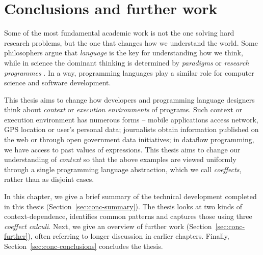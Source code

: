 \chapter{Conclusions and further work}
\label{ch:conclusions}

Some of the most fundamental academic work is not the one solving hard research problems, but the
one that changes how we understand the world. Some philosophers argue that \emph{language} is the
key for understanding how we think, while in science the dominant thinking is determined by
\emph{paradigms} \cite{philosophy-kuhn} or \emph{research programmes} \cite{philosophy-lakatos}.
In a way, programming languages play a similar role for computer science and software development.

This thesis aims to change how developers and programming language designers think about
\emph{context} or \emph{execution environments} of programs. Such context or execution environment
has numerous forms -- mobile applications access network, GPS location or user's personal data;
journalists obtain information published on the web or through open government data initiatives;
in dataflow programming, we have access to past values of expressions.
This thesis aims to change our understanding of \emph{context} so that the above examples are
viewed uniformly through a single programming language abstraction, which we call \emph{coeffects},
rather than as disjoint cases.

In this chapter, we give a brief summary of the technical development completed in this thesis
(Section~\ref{sec:conc-summary}). The thesis looks at two kinds of context-dependence, identifies
common patterns and captures those using three \emph{coeffect calculi}. Next, we give an overview
of further work (Section~\ref{sec:conc-further}), often referring to longer discussion in earlier
chapters. Finally, Section~\ref{sec:conc-conclusions} concludes the thesis.


%

